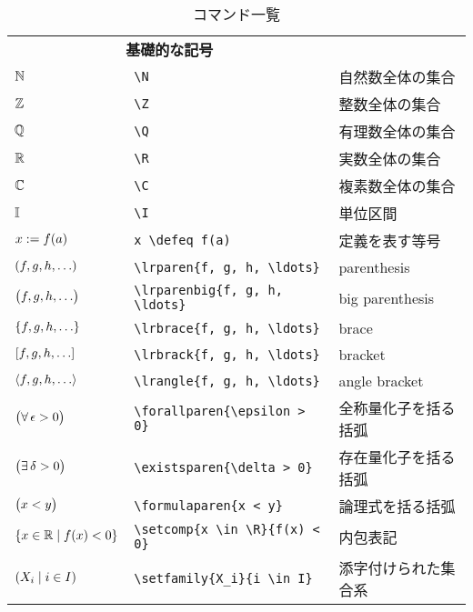 \documentclass[uplatex, dvipdfmx, 12pt, crop=false]{standalone}
\begin{document}
\newcommand{\tablesubtitle}[1]{\multicolumn{2}{c}{\textbf{#1}}}

\begin{table}[htb]
	\centering
	\renewcommand{\arraystretch}{1.2}
	\caption{コマンド一覧}
	\begin{tabular}{ll@{\qquad}l}
		\hline
		\hline

		\tablesubtitle{基礎的な記号} \\
		$\mathbb{N}$ & \verb|\N| & 自然数全体の集合 \\
		$\mathbb{Z}$ & \verb|\Z| & 整数全体の集合   \\
		$\mathbb{Q}$ & \verb|\Q| & 有理数全体の集合 \\
		$\mathbb{R}$ & \verb|\R| & 実数全体の集合   \\
		$\mathbb{C}$ & \verb|\C| & 複素数全体の集合 \\
		$\mathbb{I}$ & \verb|\I| & 単位区間         \\
		$x \mathrel{:=} f(a)$ & \verb|x \defeq f(a)| & 定義を表す等号 \\
		$\lrparen{f, g, h, \ldots}$    & \verb|\lrparen{f, g, h, \ldots}|    & parenthesis          \\
		$\bigl({f, g, h, \ldots}\bigr)$ & \verb|\lrparenbig{f, g, h, \ldots}| & big parenthesis      \\
		$\lrbrace{f, g, h, \ldots}$    & \verb|\lrbrace{f, g, h, \ldots}|    & brace                \\
		$\lrbrack{f, g, h, \ldots}$    & \verb|\lrbrack{f, g, h, \ldots}|    & bracket              \\
		$\lrangle{f, g, h, \ldots}$    & \verb|\lrangle{f, g, h, \ldots}|    & angle bracket        \\
		$\bigl({\forall\, \epsilon > 0}\bigr)$   & \verb|\forallparen{\epsilon > 0}|   & 全称量化子を括る括弧 \\
		$\bigl({\exists\, \delta > 0}\bigr)$     & \verb|\existsparen{\delta > 0}|     & 存在量化子を括る括弧 \\
		$\bigl({x < y}\bigr)$         & \verb|\formulaparen{x < y}|         & 論理式を括る括弧     \\
		$\setcomp{x \in \R}{f(x) < 0}$ & \verb|\setcomp{x \in \R}{f(x) < 0}| & 内包表記             \\
		$\setfamily{X_i}{i \in I}$     & \verb|\setfamily{X_i}{i \in I}|     & 添字付けられた集合系 \\
		\hline


\end{tabular}
\end{table}
\end{document}
